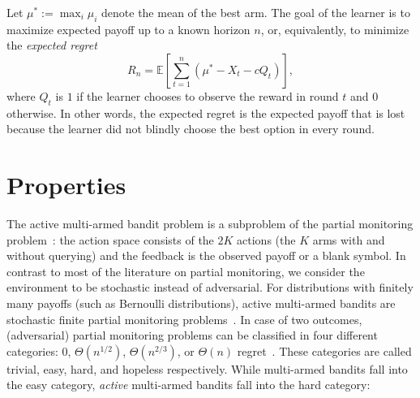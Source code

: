 \documentclass[a4paper]{article}
\DeclareMathOperator*{\argmax}{arg\,max} %
\def\regret{R}
\begin{document}
Let $\mu^* := \max_i \mu_i$ denote the mean of the best arm.
The goal of the learner is to maximize expected payoff up to a known horizon $n$,
or, equivalently, to minimize the \emph{expected regret}
\[
\regret_n = \mathbb{E} \left[ \sum_{t=1}^n (\mu^* - X_t - c Q_t) \right],
\]
where $Q_t$ is $1$ if the learner chooses to observe the reward in round $t$ and $0$ otherwise.
In other words, the expected regret is the expected payoff
that is lost
because the learner did not blindly choose the best option in every round.




\section{Properties}

The active multi-armed bandit problem is
a subproblem of the partial monitoring problem~\citep{Piccolboni01}:
the action space consists of the $2K$ actions (the $K$ arms with and without querying) and
the feedback is the observed payoff or a blank symbol.
In contrast to most of the literature on partial monitoring,
we consider the environment to be stochastic instead of adversarial.
For distributions with finitely many payoffs (such as Bernoulli distributions),
active multi-armed bandits are
stochastic finite partial monitoring problems~\citep{Komiyama15}.
In case of two outcomes,
(adversarial) partial monitoring problems can be classified in four different
categories: $0$, $\Theta(n^{1/2})$, $\Theta(n^{2/3})$, or $\Theta(n)$ regret~\citep{Antos13}.
These categories are called trivial, easy, hard, and hopeless respectively.
While multi-armed bandits fall into the easy category,
\emph{active} multi-armed bandits fall into the hard category:
\end{document}
